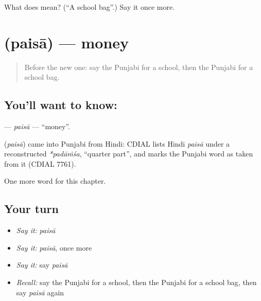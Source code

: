 \begin{tcolorbox}[breakable,colback=teal!4,colframe=teal!35!black,title={Before you move on}]
What does  mean? (\textquotedblleft{}A school bag\textquotedblright{}.) Say it once more.
\end{tcolorbox}
\section[\texorpdfstring{\pa{ਪੈਸਾ} (paisā)}{ਪੈਸਾ (paisā)}]{ (paisā) — money}

\label{lesson:PA-C72-paisa}



\begin{quote}
Before the new one: say the Punjabi for a school, then the Punjabi for a school bag.
\end{quote}

\subsection*{You'll want to know: }
\textbf{} — \emph{paisā} — \textquotedblleft{}money\textquotedblright{}.

\begin{cousinweb}
\textbf{} (\emph{paisā}) came into Punjabi from Hindi: CDIAL lists Hindi \emph{paisā} under a reconstructed \emph{*padāṁśa}, \textquotedblleft{}quarter part\textquotedblright{}, and marks the Punjabi word as taken from it (CDIAL 7761).
\end{cousinweb}

\begin{grammarlens}[title={What you've built}]
One more word for this chapter.
\end{grammarlens}

\subsection*{Your turn}
\begin{itemize}
\raggedright
  \item \emph{Say it:} \emph{paisā}
  \item \emph{Say it:} \emph{paisā}, once more
  \item \emph{Say it:} say \emph{paisā}
  \item \emph{Recall:} say the Punjabi for a school, then the Punjabi for a school bag, then say \emph{paisā} again
\end{itemize}

